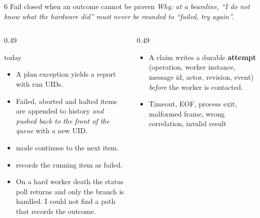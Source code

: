 \begin{frame}{6 \quad Fail closed when an outcome cannot be proven}
    {\footnotesize\itshape Why: at a beamline, ``I do not know what the hardware did'' must never be rounded to
    ``failed, try again''.}
    \vspace{0.05cm}
    \begin{columns}[T]
        \begin{column}{0.49\textwidth}
            \begin{alertblock}{\legacy{} today}
                \footnotesize
                \begin{itemize}
                    \item A plan exception yields a  report with run UIDs.
                    \item Failed, aborted and halted items are appended to history \emph{and pushed back to the
                          front of the queue} with a new UID. 
                    \item {} mode continues to the next item. 
                    \item {} records the running item as failed.
                    \item On a hard worker death the status poll returns  and only the
                           branch is handled. 
                          I could not find a path that records the outcome.
                \end{itemize}
            \end{alertblock}
        \end{column}
        \begin{column}{0.49\textwidth}
            \begin{block}{\vtwo{}}
                \footnotesize
                \begin{itemize}
                    \item A claim writes a durable \textbf{attempt} (operation, worker instance, message id,
                          actor, revision, event) \emph{before} the worker is contacted.
                    \item Timeout, EOF, process exit, malformed frame, wrong correlation, invalid result

\end{itemize}
\end{block}
\end{column}
\end{columns}
\end{frame}
